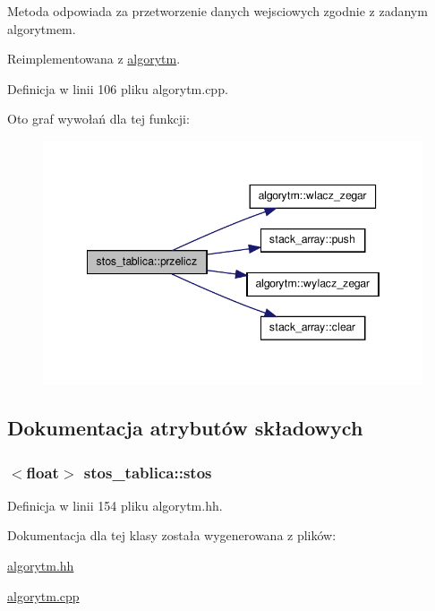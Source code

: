 \-Metoda odpowiada za przetworzenie danych wejsciowych zgodnie z zadanym algorytmem. 



\-Reimplementowana z \hyperlink{classalgorytm_af3f92bf537b1f2e1f93173983e838449}{algorytm}.



\-Definicja w linii 106 pliku algorytm.\-cpp.



\-Oto graf wywołań dla tej funkcji\-:\nopagebreak
\begin{figure}[H]
\begin{center}
\leavevmode
\includegraphics[width=346pt]{classstos__tablica_a44ec89c9723d4034e46ae3b51b01faea_cgraph}
\end{center}
\end{figure}




\subsection{\-Dokumentacja atrybutów składowych}
\hypertarget{classstos__tablica_a8aa72aa52bd2436cb12d9e1c8e077389}{
\subsubsection[{stos}]{$<$float$>$ {\bf stos\-\_\-tablica\-::stos}}}\label{classstos__tablica_a8aa72aa52bd2436cb12d9e1c8e077389}


\-Definicja w linii 154 pliku algorytm.\-hh.



\-Dokumentacja dla tej klasy została wygenerowana z plików\-:\begin{DoxyCompactItemize}
\item 
\hyperlink{algorytm_8hh}{algorytm.\-hh}\item 
\hyperlink{algorytm_8cpp}{algorytm.\-cpp}\end{DoxyCompactItemize}
